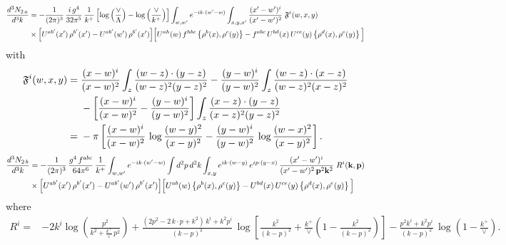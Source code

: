 \documentclass[9pt]{article}
\numberwithin{equation}{section}
\begin{document}
\begin{align}
\frac{d^{3}N_{2\,a}}{d^{3}k} & = -\frac{1}{(2\pi)^{3}}\,\frac{i\,g^{4}}{32\pi^{5}}\,\frac{1}{k^{+}}
\left[\log\left(\frac{\vee}{\Lambda}\right)-\log\left(\frac{\vee}{k^{+}}\right)\right]
\int_{w,w'} e^{-ik\cdot(w'-w)}\int_{x,y,x'}\frac{(x'-w')^{i}}{(x'-w')^{2}}\;\mathfrak{F}^{i}(w,x,y)\notag\\
&\times\Big[U^{ab'}(x')\,\rho^{b'}(x')-U^{ab'}(w')\,\rho^{b'}(x')\Big]
\Big[U^{ah}(w)\,f^{hbc}\left\{\rho^{b}(x),\rho^{c}(y)\right\}-f^{abc}\,U^{bd}(x)\,U^{ce}(y)\left\{\rho^{d}(x),\rho^{e}(y)\right\}\Big]
\end{align}
with
\begin{align}
\mathfrak{F}^{i}(w,x,y) ={}& \frac{(x-w)^{i}}{(x-w)^{2}}\int_{z}\frac{(w-z)\cdot(y-z)}{(w-z)^{2}(y-z)^{2}}
-\frac{(y-w)^{i}}{(y-w)^{2}}\int_{z}\frac{(w-z)\cdot(x-z)}{(w-z)^{2}(x-z)^{2}}\notag\\
&-\left[\frac{(x-w)^{i}}{(x-w)^{2}}-\frac{(y-w)^{i}}{(y-w)^{2}}\right]\int_{z}\frac{(x-z)\cdot(y-z)}{(x-z)^{2}(y-z)^{2}}\\
={}& -\pi\left[\frac{(x-w)^{i}}{(x-w)^{2}}\,\log\frac{(w-y)^{2}}{(x-y)^{2}}-\frac{(y-w)^{i}}{(y-w)^{2}}\,\log\frac{(w-x)^{2}}{(x-y)^{2}}\right].
\end{align}
\begin{align}
\frac{d^{3}N_{2\,b}}{d^{3}k} & = -\frac{1}{(2\pi)^{3}}\,\frac{g^{4}\,f^{abc}}{64\pi^{6}}\,\frac{1}{k^{+}}\int_{w,w'} e^{-ik\cdot(w'-w)}
\int d^{2}p\,d^{2}k\int_{x,y} e^{ik\cdot(w-y)}\,e^{ip\cdot(y-x)}\,\frac{(x'-w')^{i}}{(x'-w')^{2}\,\mathbf{p}^{2}\mathbf{k}^{2}}\;R^{i}(\mathbf{k},\mathbf{p})\notag\\
&\times\Big[U^{ab'}(x')\,\rho^{b'}(x')-U^{ab'}(w')\,\rho^{b'}(x')\Big]
\Big[U^{ab}(w)\left\{\rho^{b}(x),\rho^{c}(y)\right\}-U^{bd}(x)\,U^{ce}(y)\left\{\rho^{d}(x),\rho^{e}(y)\right\}\Big]
\end{align}
where
\begin{align}
R^{i} ={}& -2k^{i}\log\left(\frac{p^{2}}{k^{2}+\frac{k^{+}}{\vee}\,p^{2}}\right)
+\frac{(2p^{2}-2\,k\cdot p+k^{2})\,k^{i}+k^{2}p^{i}}{(k-p)^{2}}\,
\log\left[\frac{k^{2}}{(k-p)^{2}}+\frac{k^{+}}{\vee}\left(1-\frac{k^{2}}{(k-p)^{2}}\right)\right]
-\frac{p^{2}k^{i}+k^{2}p^{i}}{(k-p)^{2}}\,\log\left(1-\frac{k^{+}}{\vee}\right).
\end{align}
\end{document}
